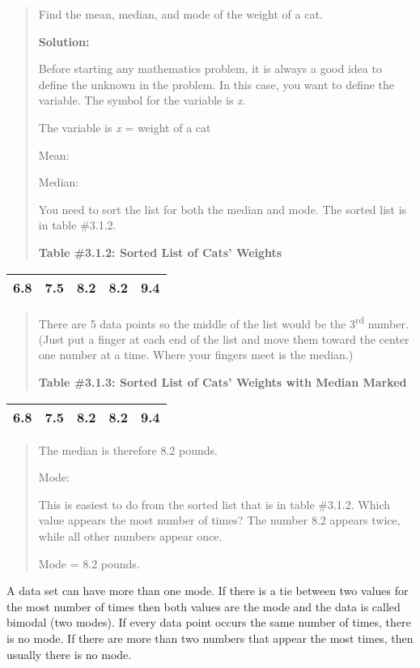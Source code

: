 \documentclass[]{book}
\begin{document}
\begin{quote}
Find the mean, median, and mode of the weight of a cat.

\textbf{Solution:}

Before starting any mathematics problem, it is always a good idea to
define the unknown in the problem. In this case, you want to define
the variable. The symbol for the variable is \emph{x}.

The variable is \emph{x} = weight of a cat

Mean:

Median:

You need to sort the list for both the median and mode. The sorted
list is in table \#3.1.2.

\textbf{Table \#3.1.2: Sorted List of Cats' Weights}
\end{quote}

\begin{longtable}[]{@{}lllll@{}}
\toprule
\endhead
6.8 & 7.5 & 8.2 & 8.2 & 9.4\tabularnewline
\bottomrule
\end{longtable}

\begin{quote}
There are 5 data points so the middle of the list would be the 3\textsuperscript{rd}
number. (Just put a finger at each end of the list and move them
toward the center one number at a time. Where your fingers meet is the
median.)

\textbf{Table \#3.1.3: Sorted List of Cats' Weights with Median Marked}
\end{quote}

\begin{longtable}[]{@{}lllll@{}}
\toprule
\endhead
6.8 & 7.5 & 8.2 & 8.2 & 9.4\tabularnewline
\bottomrule
\end{longtable}

\begin{quote}
The median is therefore 8.2 pounds.

Mode:

This is easiest to do from the sorted list that is in table \#3.1.2.
Which value appears the most number of times? The number 8.2 appears
twice, while all other numbers appear once.

Mode = 8.2 pounds.
\end{quote}

A data set can have more than one mode. If there is a tie between two
values for the most number of times then both values are the mode and
the data is called bimodal (two modes). If every data point occurs the
same number of times, there is no mode. If there are more than two
numbers that appear the most times, then usually there is no mode.
\end{document}
